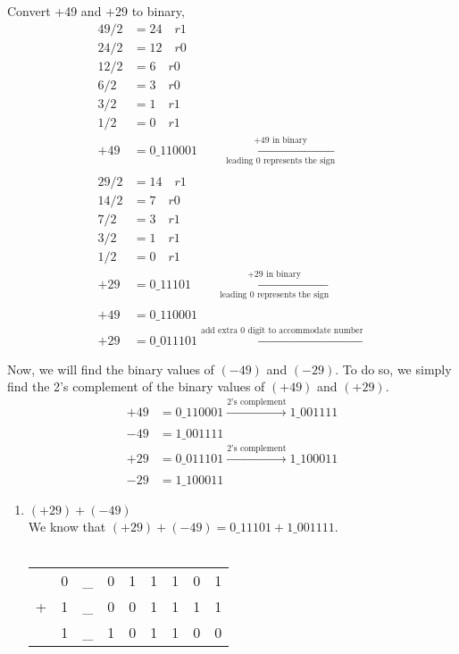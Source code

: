 \documentclass[12pt]{book}
\begin{document}
\begin{enumerate}
    Convert +49 and +29 to binary,
    \begin{align*}
        49/2 &= 24 \quad r1\\
        24/2 &= 12 \quad r0\\
        12/2 &= 6 \quad r0\\
        6/2 &= 3 \quad r0\\
        3/2 &= 1 \quad r1\\
        1/2 &= 0 \quad r1\\
        +49 &= 0\_110001 \qquad \xleftarrow[\text{leading 0 represents the sign}]{\text{+49 in binary}}\\\\
        29/2 &= 14 \quad r1\\
        14/2 &= 7 \quad r0\\
        7/2 &= 3 \quad r1\\
        3/2 &= 1 \quad r1\\
        1/2 &= 0 \quad r1\\
        +29 &= 0\_11101 \qquad \xleftarrow[\text{leading 0 represents the sign}]{\text{+29 in binary}}\\\\
        +49 &= 0\_110001\\
        +29 &= 0\_011101 \xleftarrow[]{\text{add extra 0 digit to accommodate number}}\\
    \end{align*}
    Now, we will find the binary values of $(-49)$ and $(-29)$. To do so, we simply find the 2's complement of the binary values of $(+49)$ and $(+29)$.
    \begin{align*}
        +49 &= 0\_110001 \xrightarrow[]{\text{2's complement}} 1\_001111\\
        -49 &= 1\_001111\\
        +29 &= 0\_011101 \xrightarrow[]{\text{2's complement}} 1\_100011\\
        -29 &= 1\_100011
    \end{align*}
    \begin{enumerate}
        \item $(+29)+(-49)$\\
        
        We know that $(+29)+(-49) = 0\_11101 + 1\_001111$.\\\\
        \begin{tabular}{c@{\,}c@{\,}c@{\,}c@{\,}c@{\,}c@{\,}c@{\,}c@{\,}c}
            & 0 & \_ & 0 & 1 & 1 & 1 & 0 & 1\\
            + &  1 & \_ & 0 & 0 & 1 & 1 & 1 & 1 \\
            \hline
            & 1 & \_ & 1 & 0 & 1 & 1 & 0 & 0\\
        \end{tabular}\\
        

\end{enumerate}
\end{enumerate}
\end{document}
